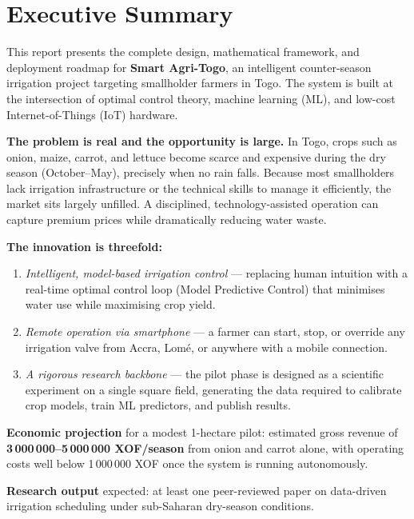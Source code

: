 \documentclass[12pt, a4paper]{report}
\begin{document}
\tableofcontents
\newpage

\chapter*{Executive Summary}

This report presents the complete design, mathematical framework, and deployment roadmap for \textbf{Smart Agri-Togo}, an intelligent counter-season irrigation project targeting smallholder farmers in Togo. The system is built at the intersection of optimal control theory, machine learning (ML), and low-cost Internet-of-Things (IoT) hardware.

\textbf{The problem is real and the opportunity is large.} In Togo, crops such as onion, maize, carrot, and lettuce become scarce and expensive during the dry season (October–May), precisely when no rain falls. Because most smallholders lack irrigation infrastructure or the technical skills to manage it efficiently, the market sits largely unfilled. A disciplined, technology-assisted operation can capture premium prices while dramatically reducing water waste.

\textbf{The innovation is threefold:}
\begin{enumerate}[leftmargin=2em]
  \item \textit{Intelligent, model-based irrigation control} — replacing human intuition with a real-time optimal control loop (Model Predictive Control) that minimises water use while maximising crop yield.
  \item \textit{Remote operation via smartphone} — a farmer can start, stop, or override any irrigation valve from Accra, Lomé, or anywhere with a mobile connection.
  \item \textit{A rigorous research backbone} — the pilot phase is designed as a scientific experiment on a single square field, generating the data required to calibrate crop models, train ML predictors, and publish results.
\end{enumerate}

\textbf{Economic projection} for a modest 1-hectare pilot: estimated gross revenue of \textbf{3\,000\,000–5\,000\,000 XOF/season} from onion and carrot alone, with operating costs well below 1\,000\,000 XOF once the system is running autonomously.

\textbf{Research output} expected: at least one peer-reviewed paper on data-driven irrigation scheduling under sub-Saharan dry-season conditions.
\end{document}
